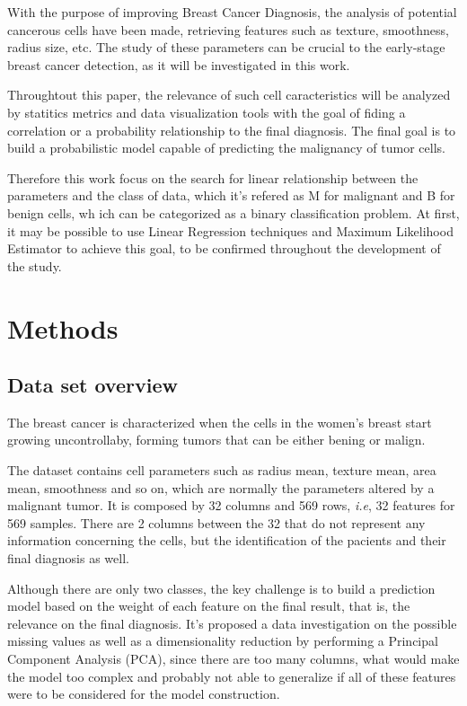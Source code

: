 \documentclass[conference]{IEEEtran}
\begin{document}
With the purpose of improving Breast Cancer Diagnosis, the analysis of potential cancerous cells have been made,
retrieving features such as texture, smoothness, radius size, etc. The study of these parameters can be crucial 
to the early-stage breast cancer detection, as it will be investigated in this work. 

Throughtout this paper, the relevance of such cell caracteristics will be analyzed by statitics metrics and data visualization tools 
with the goal of fiding a correlation or a probability relationship to the final diagnosis. The final goal is to 
build a probabilistic model capable of predicting the malignancy of tumor cells.

Therefore this work focus on the search for linear relationship between the parameters 
and the class of data, which it's refered as M for malignant and B for benign cells, wh ich can be 
categorized as a binary classification problem. At first, it may be possible to use 
Linear Regression techniques and Maximum Likelihood Estimator to achieve this goal, to be 
confirmed throughout the development of the study. 

\section{Methods}

\subsection{Data set overview}

The breast cancer is characterized when the cells in the women's breast start
growing uncontrollaby, forming tumors that can be either bening or malign. 

The dataset contains cell parameters such as radius mean, texture mean, area mean, 
smoothness and so on, which are normally the parameters altered by a malignant
tumor. 
It is composed by 32 columns and 569 rows, \textit{i.e}, 32 features 
for 569 samples. There are 2 columns between the 32 that do not represent any 
information concerning the cells, but the identification of the pacients and 
their final diagnosis as well. 

Although there are only two classes, the key challenge is to build a prediction
model based on the weight of each feature on the final result, that is, the relevance
on the final diagnosis. It's proposed a data investigation on the possible missing values as 
well as a dimensionality reduction by performing a Principal Component Analysis (PCA), 
since there are too many columns, what would make the model too complex and probably not able 
to generalize if all of these features were to be considered for the model construction. 
\end{document}
